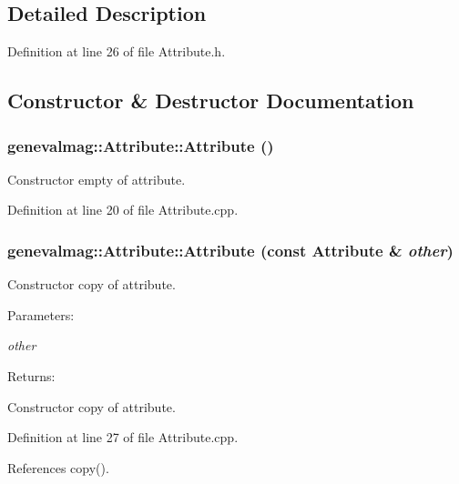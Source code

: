 \subsection{Detailed Description}


Definition at line 26 of file Attribute.h.

\subsection{Constructor \& Destructor Documentation}
\hypertarget{classgenevalmag_1_1Attribute_ac01d62e0d5fc5448b03be75e8f74248}{
\subsubsection[{Attribute}]{\setlength{\rightskip}{0pt plus 5cm}genevalmag::Attribute::Attribute ()}}
\label{classgenevalmag_1_1Attribute_ac01d62e0d5fc5448b03be75e8f74248}


Constructor empty of attribute. 

Definition at line 20 of file Attribute.cpp.\hypertarget{classgenevalmag_1_1Attribute_6f7d7f355ad08b739593f77fc782a731}{
\subsubsection[{Attribute}]{\setlength{\rightskip}{0pt plus 5cm}genevalmag::Attribute::Attribute (const {\bf Attribute} \& {\em other})}}
\label{classgenevalmag_1_1Attribute_6f7d7f355ad08b739593f77fc782a731}


Constructor copy of attribute. \begin{Desc}
\item[Parameters:]
\begin{description}
\item[{\em other}]\end{description}
\end{Desc}
\begin{Desc}
\item[Returns:]\end{Desc}
Constructor copy of attribute. 

Definition at line 27 of file Attribute.cpp.

References copy().

